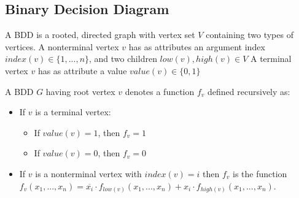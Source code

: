 \subsection{Binary Decision Diagram}
\begin{mydef}
A BDD is a rooted, directed graph with vertex set $V$ containing two types of vertices. A nonterminal vertex $v$ has as attributes an argument index $index(v) \in \{1,...,n\}$, and two children $low(v),high(v) \in V$ A terminal vertex $v$ has as attribute a value $value(v) \in \{0,1\}$
\end{mydef}

\begin{mydef}
A BDD $G$ having root vertex $v$ denotes a function $f_v$ defined recursively as:
\begin{itemize}
\item If $v$ is a terminal vertex:
\begin{itemize}
\item If $value(v)=1$, then $f_v=1$
\item If $value(v)=0$, then $f_v=0$
\end{itemize}
\item If $v$ is a nonterminal vertex with $index(v)=i$ then $f_v$ is the function
$f_v(x_1,...,x_n) = \overline{x_i}\cdot f_{low(v)}(x_1,...,x_n)+x_i\cdot f_{high(v)}(x_1,...,x_n)$.
\end{itemize}
\end{mydef}